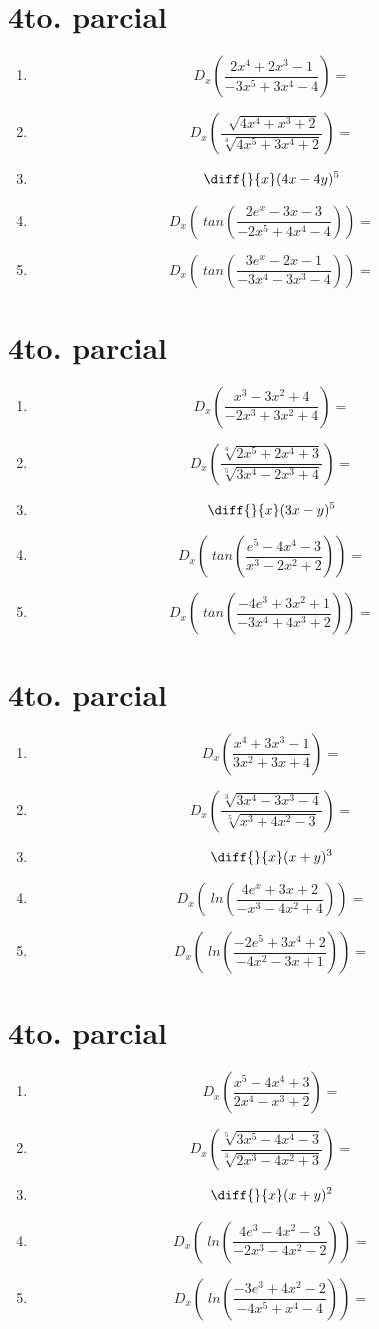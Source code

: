 \documentclass[oneside,spanish,letter]{article}
\begin{document}
\section{4to. parcial}
\begin{enumerate}
 \item $$ D_x \left( \frac{2x^4+2x^3-1}{-3x^5+3x^4-4}\right)=$$
 \item $$ D_x \left( \frac{\sqrt[]{4x^4+x^3+2}}{\sqrt[4]{4x^5+3x^4+2}}\right)=$$
\item $$\diff{}{x}(4x-4y)^5$$
 \item $$ D_x \left(\;tan\left( \frac{2e^x-3x-3}{-2x^5+4x^4-4}\right)\right)=$$
 \item $$ D_x \left(\;tan\left( \frac{3e^x-2x-1}{-3x^4-3x^3-4}\right)\right)=$$
 \end{enumerate}
  \newpage
\section{4to. parcial}
\begin{enumerate}
 \item $$ D_x \left( \frac{x^3-3x^2+4}{-2x^3+3x^2+4}\right)=$$
 \item $$ D_x \left( \frac{\sqrt[4]{2x^5+2x^4+3}}{\sqrt[5]{3x^4-2x^3+4}}\right)=$$
\item $$\diff{}{x}(3x-y)^5$$
 \item $$ D_x \left(\;tan\left( \frac{e^5-4x^4-3}{x^3-2x^2+2}\right)\right)=$$
 \item $$ D_x \left(\;tan\left( \frac{-4e^3+3x^2+1}{-3x^4+4x^3+2}\right)\right)=$$
 \end{enumerate}
  \newpage
\section{4to. parcial}
\begin{enumerate}
 \item $$ D_x \left( \frac{x^4+3x^3-1}{3x^2+3x+4}\right)=$$
 \item $$ D_x \left( \frac{\sqrt[3]{3x^4-3x^3-4}}{\sqrt[5]{x^3+4x^2-3}}\right)=$$
\item $$\diff{}{x}(x+y)^3$$
 \item $$ D_x \left(\;ln\left( \frac{4e^x+3x+2}{-x^3-4x^2+4}\right)\right)=$$
 \item $$ D_x \left(\;ln\left( \frac{-2e^5+3x^4+2}{-4x^2-3x+1}\right)\right)=$$
 \end{enumerate}
  \newpage
\section{4to. parcial}
\begin{enumerate}
 \item $$ D_x \left( \frac{x^5-4x^4+3}{2x^4-x^3+2}\right)=$$
 \item $$ D_x \left( \frac{\sqrt[5]{3x^5-4x^4-3}}{\sqrt[3]{2x^3-4x^2+3}}\right)=$$
\item $$\diff{}{x}(x+y)^2$$
 \item $$ D_x \left(\;ln\left( \frac{4e^3-4x^2-3}{-2x^3-4x^2-2}\right)\right)=$$
 \item $$ D_x \left(\;ln\left( \frac{-3e^3+4x^2-2}{-4x^5+x^4-4}\right)\right)=$$
 \end{enumerate}
  \newpage
\end{document}
